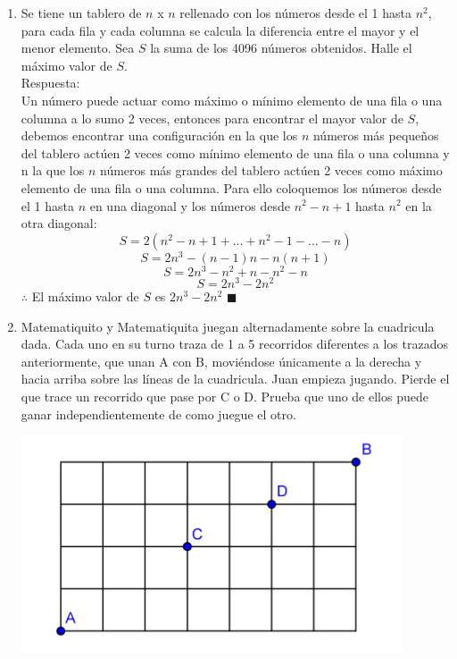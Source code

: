 \documentclass{book}
\begin{document}
\begin{enumerate}
				     \item Se tiene un tablero de $n$ x $n$ rellenado con los números desde el 1 hasta $n^2$, para cada fila y cada columna se calcula la diferencia entre el mayor y el menor elemento. Sea $S$ la suma de los 4096 números obtenidos. Halle el máximo valor de $S$.\\
				     Respuesta:\\
				     Un número puede actuar como máximo o mínimo elemento de una fila o una columna a lo sumo 2 veces, entonces para encontrar el mayor valor de $S$, debemos encontrar una configuración en la que los $n$ números más pequeños del tablero actúen 2 veces como mínimo elemento de una fila o una columna y n la que los $n$ números más grandes del tablero actúen 2 veces como máximo elemento de una fila o una columna. Para ello coloquemos los números desde el 1 hasta $n$ en una diagonal y los números desde $n^2-n+1$ hasta $n^2$ en la otra diagonal:
				     $$S=2(n^2-n+1+\ldots +n^2-1-\ldots-n)$$
				     $$S=2n^3-(n-1)n-n(n+1)$$
				     $$S=2n^3-n^2+n-n^2-n$$
				     $$S=2n^3-2n^2$$
				     $\therefore$ El máximo valor de $S$ es $2n^3-2n^2$ $\blacksquare$\\
				     \item Matematiquito y Matematiquita juegan alternadamente sobre la cuadricula dada. Cada uno en su turno traza de 1 a 5 recorridos diferentes a los trazados anteriormente, que unan A con B, moviéndose únicamente a la derecha y hacia arriba sobre las líneas de la cuadricula. Juan empieza jugando. Pierde el que trace un recorrido que pase por C o D. Prueba que uno de ellos puede ganar independientemente de como juegue el otro.
					\begin{center}
						\includegraphics[scale=1]{imagenes/Combinatoria/13.png}
					\end{center}
			

\end{enumerate}
\end{document}
